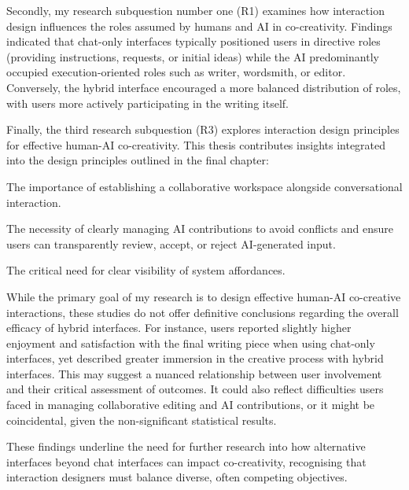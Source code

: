 Secondly, my research subquestion number one (R1) examines how interaction design influences the roles assumed by humans and AI in co-creativity. Findings indicated that chat-only interfaces typically positioned users in directive roles (providing instructions, requests, or initial ideas) while the AI predominantly occupied execution-oriented roles such as writer, wordsmith, or editor. Conversely, the hybrid interface encouraged a more balanced distribution of roles, with users more actively participating in the writing itself.

Finally, the third research subquestion (R3) explores interaction design principles for effective human-AI co-creativity. This thesis contributes insights integrated into the design principles outlined in the final chapter:

The importance of establishing a collaborative workspace alongside conversational interaction.

The necessity of clearly managing AI contributions to avoid conflicts and ensure users can transparently review, accept, or reject AI-generated input.

The critical need for clear visibility of system affordances.

While the primary goal of my research is to design effective human-AI co-creative interactions, these studies do not offer definitive conclusions regarding the overall efficacy of hybrid interfaces. For instance, users reported slightly higher enjoyment and satisfaction with the final writing piece when using chat-only interfaces, yet described greater immersion in the creative process with hybrid interfaces. This may suggest a nuanced relationship between user involvement and their critical assessment of outcomes. It could also reflect difficulties users faced in managing collaborative editing and AI contributions, or it might be coincidental, given the non-significant statistical results.

These findings underline the need for further research into how alternative interfaces beyond chat interfaces can impact co-creativity, recognising that interaction designers must balance diverse, often competing objectives.



